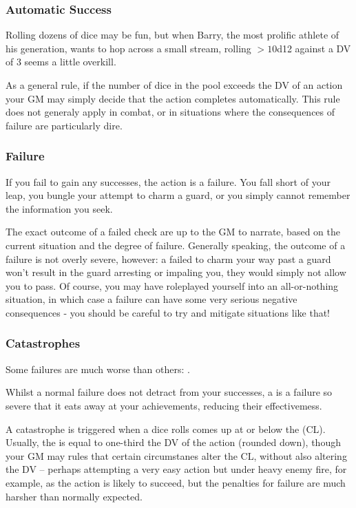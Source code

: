 \subsubsection{Automatic Success}

Rolling dozens of dice may be fun, but when Barry, the most prolific athlete of his generation, wants to hop across a small stream, rolling $>10$d12 against a DV of 3 seems a little overkill. 

As a general rule, if the number of dice in the pool exceeds the DV of an action your GM may simply decide that the action completes automatically. This rule does not generaly apply in combat, or in situations where the consequences of failure are particularly dire. 

\subsubsection{Failure}

If you fail to gain any successes, the action is a failure. You fall short of your leap, you bungle your attempt to charm a guard, or you simply cannot remember the information you seek. 

The exact outcome of a failed check are up to the GM to narrate, based on the current situation and the degree of failure. Generally speaking, the outcome of a failure is not overly severe, however: a failed  to charm your way past a guard won't result in the guard arresting or impaling you, they would simply not allow you to pass. Of course, you may have roleplayed yourself into an all-or-nothing situation, in which case a failure can have some very serious negative consequences - you should be careful to try and mitigate situations like that!

\subsubsection{Catastrophes} \label{S:Catastrophe}

Some failures are much worse than others: . 

Whilst a normal failure does not detract from your successes, a  is a failure so severe that it eats away at your achievements, reducing their effectivemess. 


A catastrophe is triggered when a dice rolls comes up at or below the  (CL). Usually, the  is equal to one-third the DV of the action (rounded down), though your GM may rules that certain circumstanes alter the CL, without also altering the DV -- perhaps attempting a very easy action but under heavy enemy fire, for example, as the action is likely to succeed, but the penalties for failure are much harsher than normally expected.

